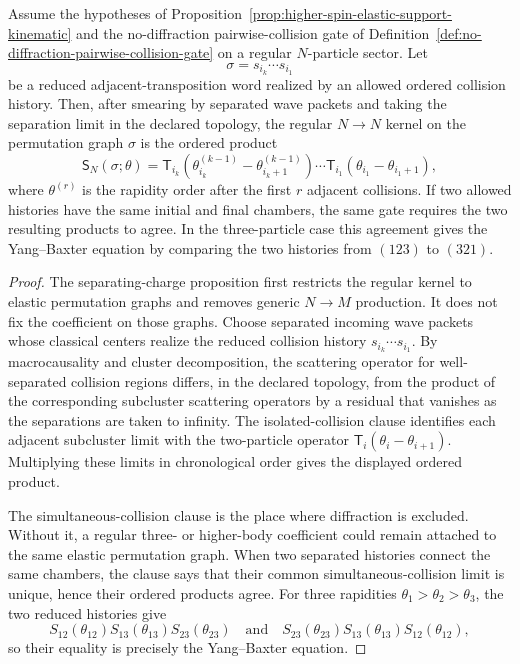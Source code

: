 \begin{proposition}
\label{prop:conditional-pairwise-factorization-no-diffraction}
Assume the hypotheses of
Proposition~\ref{prop:higher-spin-elastic-support-kinematic} and the
no-diffraction pairwise-collision gate of
Definition~\ref{def:no-diffraction-pairwise-collision-gate} on a regular
\(N\)-particle sector.  Let
\[
  \sigma=s_{i_k}\cdots s_{i_1}
\]
be a reduced adjacent-transposition word realized by an allowed ordered
collision history.  Then, after smearing by separated wave packets and taking
the separation limit in the declared topology, the regular \(N\to N\) kernel on
the permutation graph \(\sigma\) is the ordered product
\[
  \mathsf S_N(\sigma;\theta)
  =
  \mathsf T_{i_k}(\theta^{(k-1)}_{i_k}
    -\theta^{(k-1)}_{i_k+1})
  \cdots
  \mathsf T_{i_1}(\theta_{i_1}-\theta_{i_1+1}),
\]
where \(\theta^{(r)}\) is the rapidity order after the first \(r\) adjacent
collisions.  If two allowed histories have the same initial and final chambers,
the same gate requires the two resulting products to agree.  In the
three-particle case this agreement gives the Yang--Baxter equation by comparing
the two histories from \((123)\) to \((321)\).
\end{proposition}

\begin{proof}
The separating-charge proposition first restricts the regular kernel to elastic
permutation graphs and removes generic \(N\to M\) production.  It does not fix
the coefficient on those graphs.  Choose separated incoming wave packets whose
classical centers realize the reduced collision history
\(s_{i_k}\cdots s_{i_1}\).  By macrocausality and cluster decomposition, the
scattering operator for well-separated collision regions differs, in the
declared topology, from the product of the corresponding subcluster scattering
operators by a residual that vanishes as the separations are taken to infinity.
The isolated-collision clause identifies each adjacent subcluster limit with the
two-particle operator \(\mathsf T_i(\theta_i-\theta_{i+1})\).  Multiplying these
limits in chronological order gives the displayed ordered product.

The simultaneous-collision clause is the place where diffraction is excluded.
Without it, a regular three- or higher-body coefficient could remain attached
to the same elastic permutation graph.  When two separated histories connect
the same chambers, the clause says that their common simultaneous-collision
limit is unique, hence their ordered products agree.  For three rapidities
\(\theta_1>\theta_2>\theta_3\), the two reduced histories give
\[
  S_{12}(\theta_{12})S_{13}(\theta_{13})S_{23}(\theta_{23})
  \quad\text{and}\quad
  S_{23}(\theta_{23})S_{13}(\theta_{13})S_{12}(\theta_{12}),
\]
so their equality is precisely the Yang--Baxter equation.
\end{proof}

